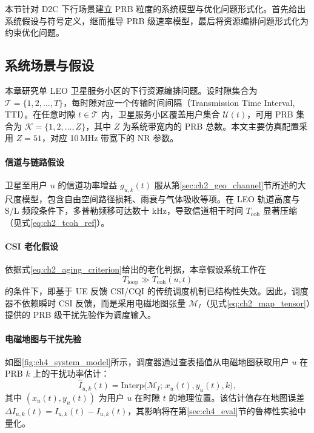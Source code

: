 \documentclass[type=master]{fduthesis}
\begin{document}
本节针对 D2C 下行场景建立 PRB 粒度的系统模型与优化问题形式化。首先给出系统假设与符号定义，继而推导 PRB 级速率模型，最后将资源编排问题形式化为约束优化问题。

\subsection{系统场景与假设}
\label{subsec:ch4_scenario}

本章研究单 LEO 卫星服务小区的下行资源编排问题。设时隙集合为 $\mathcal{T}=\{1,2,\ldots,T\}$，每时隙对应一个传输时间间隔（Transmission Time Interval, TTI）。在任意时隙 $t\in\mathcal{T}$ 内，卫星服务小区覆盖用户集合 $\mathcal{U}(t)$，可用 PRB 集合为 $\mathcal{K}=\{1,2,\ldots,Z\}$，其中 $Z$ 为系统带宽内的 PRB 总数。本文主要仿真配置采用 $Z=51$，对应 10\,MHz 带宽下的 NR 参数。

\paragraph{信道与链路假设}
卫星至用户 $u$ 的信道功率增益 $g_{u,k}(t)$ 服从第\ref{sec:ch2_geo_channel}节所述的大尺度模型，包含自由空间路径损耗、雨衰与气体吸收等项。在 LEO 轨道高度与 S/L 频段条件下，多普勒频移可达数十 kHz，导致信道相干时间 $T_{\mathrm{coh}}$ 显著压缩（见式\eqref{eq:ch2_tcoh_ref}）。

\paragraph{CSI 老化假设}
依据式\eqref{eq:ch2_aging_criterion}给出的老化判据，本章假设系统工作在
\begin{equation}
T_{\mathrm{loop}} \gg T_{\mathrm{coh}}(u,t)
\label{eq:ch4_aging_assumption}
\end{equation}
的条件下，即基于 UE 反馈 CSI/CQI 的传统调度机制已结构性失效。因此，调度器不依赖瞬时 CSI 反馈，而是采用电磁地图张量 $\mathcal{M}_I$（见式\eqref{eq:ch2_map_tensor}）提供的 PRB 级干扰先验作为调度输入。

\paragraph{电磁地图与干扰先验}
如图\ref{fig:ch4_system_model}所示，调度器通过查表插值从电磁地图获取用户 $u$ 在 PRB $k$ 上的干扰功率估计：
\begin{equation}
\hat{I}_{u,k}(t) = \mathrm{Interp}\Big(\mathcal{M}_I;\, x_u(t), y_u(t), k\Big),
\label{eq:ch4_interf_lookup}
\end{equation}
其中 $(x_u(t), y_u(t))$ 为用户 $u$ 在时隙 $t$ 的地理位置。该估计值存在地图误差 $\Delta I_{u,k}(t) = \hat{I}_{u,k}(t) - I_{u,k}(t)$，其影响将在第\ref{sec:ch4_eval}节的鲁棒性实验中量化。
\end{document}
